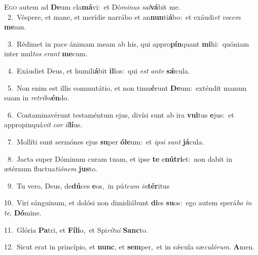 \lettrine{\initial\textcolor{\initialcolor}{E}}{go} autem ad \textbf{De}\-um cla\-\textbf{má}\-vi:~\star et Dó\-\textit{mi}\-\textit{nus} \textit{sal}\-\textbf{vá}bit me.\\
{\numbfont\textcolor{\numbcolor}{~2.}}~Véspere, et mane, et merídie narrábo et an\-\textbf{nun}\-ti\-\textbf{á}\-bo:~\star et exáudi\textit{et} \textit{vo}\-\textit{cem} \textbf{me}\-am.\par
{\numbfont\textcolor{\numbcolor}{~3.}}~Rédimet in pace ánimam meam ab his, qui appro\-\textbf{pín}\-quant \textbf{mi}\-hi:~\star quóniam inter mul\textit{tos} \textit{e}\-\textit{rant} \textbf{me}\-cum.\par
{\numbfont\textcolor{\numbcolor}{~4.}}~Exáudiet Deus, et humili\-\textbf{á}\-bit \textbf{il}\-los:~\star qui \textit{est} \textit{an}\-\textit{te} \textbf{sǽ}\-cula.\par
{\numbfont\textcolor{\numbcolor}{~5.}}~Non enim est illis commutátio, et non timu\-\textbf{é}\-runt \textbf{De}\-um:~\star exténdit manum suam in \textit{re}\-\textit{tri}\textit{bu}\textbf{én}do.\par
{\numbfont\textcolor{\numbcolor}{~6.}}~Contaminavérunt testaméntum ejus, divísi sunt ab ira \textbf{vul}\-tus \textbf{e}\-jus:~\star et appropinquá\textit{vit} \textit{cor} \textit{il}\-\textbf{lí}us.\par
{\numbfont\textcolor{\numbcolor}{~7.}}~Mollíti sunt sermónes ejus \textbf{su}\-per \textbf{ó}\-\textbf{le}um:~\star et \textit{ip}\-\textit{si} \textit{sunt} \textbf{já}\-cula.\par
{\numbfont\textcolor{\numbcolor}{~8.}}~Jacta super Dóminum curam tuam, et ipse \textbf{te} e\-\textbf{nú}\-\textbf{tri}et:~\star non dabit in ætérnum fluctua\-\textit{ti}\-\textit{ó}\textit{nem} \textbf{jus}\-to.\par
{\numbfont\textcolor{\numbcolor}{~9.}}~Tu vero, Deus, de\-\textbf{dú}\-ces \textbf{e}\-os,~\star in pú\-\textit{te}\-\textit{um} \textit{in}\-\textbf{tér}itus\par
{\numbfont\textcolor{\numbcolor}{10.}}~Viri sánguinum, et dolósi non dimidiábunt \textbf{di}\-es \textbf{su}\-os:~\star ego autem sperá\textit{bo} \textit{in} \textit{te}\-, \textbf{Dó}\-mine.\par
{\numbfont\textcolor{\numbcolor}{11.}}~Glória \textbf{Pa}\-tri, et \textbf{Fí}\-\textbf{li}o,~\star et Spi\-\textit{rí}\-\textit{tu}\textit{i} \textbf{Sanc}\-to.\par
{\numbfont\textcolor{\numbcolor}{12.}}~Sicut erat in princípio, et \textbf{nunc}\-, et \textbf{sem}\-per,~\star et in sǽcula sæ\-\textit{cu}\-\textit{ló}\textit{rum}. \textbf{A}\-men.\par
